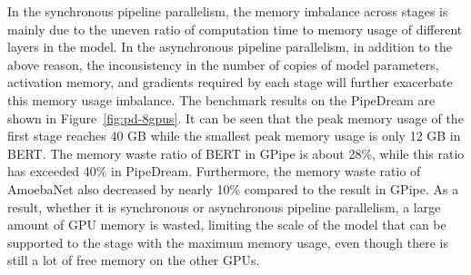 In the synchronous pipeline parallelism,
the memory imbalance across stages is mainly
due to the uneven ratio of computation time
to memory usage of different layers in the model.
In the asynchronous pipeline parallelism,
in addition to the above reason,
the inconsistency in the number of copies of model parameters,
activation memory, and gradients required by each stage will
further exacerbate this memory usage imbalance.
The benchmark results on the PipeDream are shown in Figure~\ref{fig:pd-8gpus}.
It can be seen that the peak memory usage of the first stage
reaches 40 GB while the smallest peak memory usage is only 12 GB in BERT.
The memory waste ratio of BERT in GPipe is about 28\%,
while this ratio has exceeded 40\% in PipeDream.
Furthermore, the memory waste ratio of AmoebaNet also decreased
by nearly 10\% compared to the result in GPipe.
As a result, whether it is synchronous or asynchronous pipeline parallelism,
a large amount of GPU memory is wasted,
limiting the scale of the model that can be supported to the stage with the maximum memory usage,
even though there is still a lot of free memory on the other GPUs.

